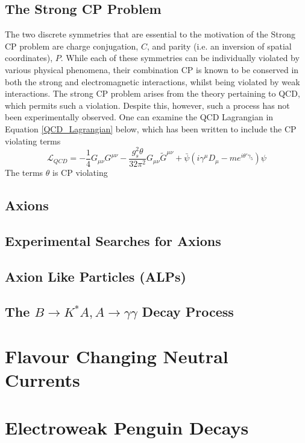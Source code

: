 \subsection{The Strong CP Problem}
The two discrete symmetries that are essential to the motivation of the Strong CP problem are charge conjugation, $C$, and parity (i.e. an inversion of spatial coordinates), $P$. While each
of these symmetries can be individually violated by various physical phenomena, their combination CP is known to be conserved in both the strong and electromagnetic interactions, whilst being violated by weak interactions. The strong CP problem arises from the theory pertaining to QCD, which
permits such a violation. Despite this, however, such a process has not been experimentally observed. One can examine the QCD Lagrangian in Equation \ref{QCD_Lagrangian} below, which has been written to include the CP violating terms
\begin{equation}\label{QCD_Lagrangian}
    \mathcal{L}_{QCD} = -\frac{1}{4}G_{\mu\nu}G^{\mu\nu}-\frac{g_{s}^{2}\theta}{32\pi^{2}}G_{\mu\nu}\tilde{G}^{\mu\nu}+\bar{\psi}(i\gamma^{\mu}D_{\mu}-me^{i\theta'\gamma_{5}})\psi
\end{equation}
The terms $\theta$ is CP violating
\subsection{Axions}
\subsection{Experimental Searches for Axions}
\subsection{Axion Like Particles (ALPs)}
\subsection{The $B\rightarrow K^{*}A, A\rightarrow\gamma\gamma$ Decay Process}
\section{Flavour Changing Neutral Currents} 
\section{Electroweak Penguin Decays} 
